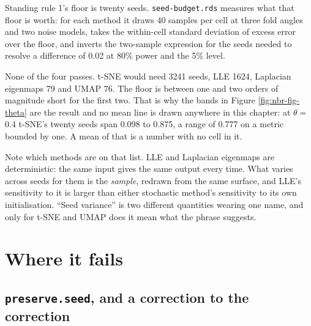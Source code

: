 \documentclass[
  british,
  a4paper,
]{book}
\newenvironment{Shaded}{\begin{snugshade}}{\end{snugshade}}
\newcommand{\FunctionTok}[1]{\textcolor[rgb]{0.13,0.29,0.53}{\textbf{#1}}}
\newcommand{\NormalTok}[1]{#1}
\newcommand{\OtherTok}[1]{\textcolor[rgb]{0.56,0.35,0.01}{#1}}
\newcommand{\SpecialCharTok}[1]{\textcolor[rgb]{0.81,0.36,0.00}{\textbf{#1}}}
\newcommand{\StringTok}[1]{\textcolor[rgb]{0.31,0.60,0.02}{#1}}
\begin{document}
\begin{Shaded}
\end{Shaded}

Standing rule 1's floor is twenty seeds. \texttt{seed-budget.rds} measures what that
floor is worth: for each method it draws 40
samples per cell at three fold angles and two noise models, takes the
within-cell standard deviation of excess error over the floor, and inverts the
two-sample expression for the seeds needed to resolve a difference of
0.02 at 80\% power and the 5\% level.

None of the four passes. t-SNE would need 3241
seeds, LLE 1624, Laplacian eigenmaps
79 and UMAP
76. The floor is between one and two
orders of magnitude short for the first two. That is why the bands in Figure
\ref{fig:nbr-fig-theta} are the result and no mean line is drawn anywhere in
this chapter: at \(\theta =\) 0.4 t-SNE's twenty seeds span
0.098 to 0.875, a range of
0.777 on a metric bounded by one. A mean of that is a number
with no cell in it.

Note which methods are on that list. LLE and Laplacian eigenmaps are
deterministic: the same input gives the same output every time. What varies
across seeds for them is the \emph{sample}, redrawn from the same surface, and LLE's
sensitivity to it is larger than either stochastic method's sensitivity to its
own initialisation. ``Seed variance'' is two different quantities wearing one
name, and only for t-SNE and UMAP does it mean what the phrase suggests.

\section{Where it fails}\label{nbr-limits}

\subsection{\texorpdfstring{\texttt{preserve.seed}, and a correction to the correction}{preserve.seed, and a correction to the correction}}\label{preserve.seed-and-a-correction-to-the-correction}
\end{document}
